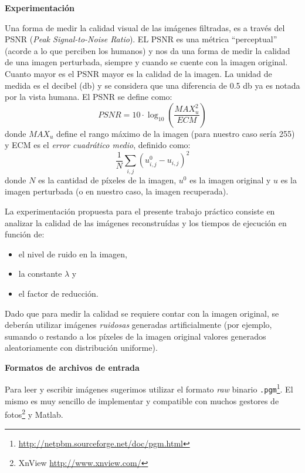 \documentclass[a4paper]{article}
\begin{document}
{\bf Experimentaci\'on}

Una forma de medir la calidad visual de las im\'agenes filtradas, es a trav\'es del PSNR ({\em Peak Signal-to-Noise Ratio}).
EL PSNR es una m\'etrica ``perceptual'' (acorde a lo que perciben los humanos) y nos da una forma de medir la calidad de una imagen perturbada, siempre y cuando se cuente con la imagen original. 
Cuanto mayor es el PSNR mayor es la calidad de la imagen. La unidad de medida es el decibel (db) y se considera que una diferencia de 0.5 db ya es notada por la vista humana. El PSNR se define como:
$$
\mathit{PSNR} = 10 \cdot \log_{10} \left( \frac{\mathit{MAX}^2_u}{\mathit{ECM}} \right)
$$
donde $MAX_u$ define el rango m\'aximo de la imagen (para nuestro caso ser\'ia 255) y ECM es el {\em error cuadr\'atico medio}, definido como:
$$
\frac{1}{N} \sum_{i,j}{(u^0_{i,j} - u_{i,j})^2} 
$$
donde $N$ es la cantidad de p\'ixeles de la imagen, $u^0$ es la imagen original y $u$ es la imagen perturbada (o en nuestro caso, la imagen recuperada).

La experimentaci\'on propuesta para el presente trabajo pr\'actico consiste en analizar la calidad de las im\'agenes reconstru\'idas y los tiempos de ejecuci\'on en funci\'on de: \\[-8mm]
	\begin{itemize}
		\item el nivel de ruido en la imagen, \\[-6mm]
		\item la constante $\lambda$ y\\[-6mm]
		\item el factor de reducci\'on. \\[-6mm]
	\end{itemize}	
	
Dado que para medir la calidad se requiere contar con la imagen original, se deber\'an utilizar im\'agenes \emph{ruidosas} generadas artificialmente (por ejemplo, sumando o restando a los p\'ixeles de la imagen original valores generados aleatoriamente con distribuci\'on uniforme).
	
{\bf Formatos de archivos de entrada}

Para leer y escribir im\'agenes sugerimos utilizar el formato {\em raw} binario \texttt{.pgm}\footnote{\url{http://netpbm.sourceforge.net/doc/pgm.html}}. 
El mismo es muy sencillo de implementar y compatible con muchos gestores de fotos\footnote{XnView \url{http://www.xnview.com/}} y Matlab.
\end{document}
